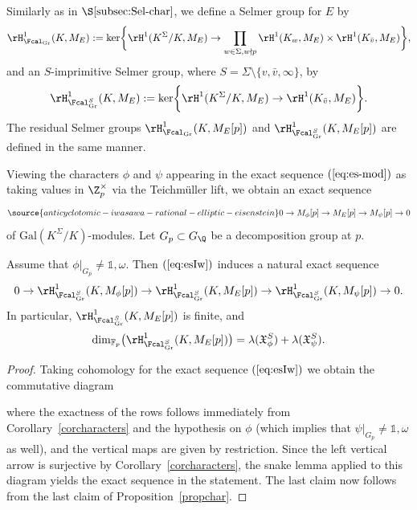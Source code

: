 Similarly as in $\S\ref{subsec:Sel-char}$, we define a Selmer group for $E$ by
\[
\rH^1_{\Fcal_{\rm Gr}}(K,M_E):=\ker\biggr\{\rH^1(K^\Sigma/K,M_E)\rightarrow\prod_{w \in \Sigma, w \nmid p}\rH^1(K_w,M_E)\times\rH^1(K_{\bar{v}},M_E)\biggr\},
\]
and an
{$S$-imprimitive Selmer group}, where $S=\Sigma\setminus\{v,\bar{v},\infty\}$, by
\[
\rH^1_{\Fcal_{\rm Gr}^S}(K,M_E):=\ker\biggr\{\rH^1(K^\Sigma/K,M_E)\rightarrow\rH^1(K_{\bar{v}},M_E)\biggr\}.
\]
The residual Selmer groups $\rH^1_{\Fcal_{\rm Gr}}(K,M_E[p])$ and $\rH^1_{\Fcal_{\rm Gr}^S}(K,M_E[p])$ are defined in the same manner.

Viewing the characters $\phi$ and $\psi$ appearing in the exact sequence $(\ref{eq:es-mod})$ as taking values in $\Z_p^\times$ via the Teichm\"uller lift, we obtain an exact sequence
\begin{equation}\label{eq:esIw}
\source{anticyclotomic-iwasawa-rational-elliptic-eisenstein}
0 \rightarrow M_\phi[p] \rightarrow M_E[p] \rightarrow M_\psi[p] \rightarrow 0
\end{equation}
of $\mathrm{Gal}(K^{\Sigma}/K)$-modules. Let $G_p\subset G_\Q$ be a decomposition group at $p$.

\begin{prop}
\notready\label{cormodp}
Assume that $\phi\vert_{G_{p}}\neq\mathds{1},\omega$. Then
$(\ref{eq:esIw})$ induces a natural exact sequence
\[
0 \rightarrow \rH^1_{\Fcal_{\rm Gr}^S}(K,M_\phi[p]) \rightarrow \rH^1_{\Fcal_{\rm Gr}^S}(K,M_E[p]) \rightarrow
\rH^1_{\Fcal_{\rm Gr}^S}(K,M_\psi[p]) \rightarrow 0.
\]
In particular, $\rH^1_{\Fcal_{\rm Gr}^S}(K,M_E[p])$ is finite, and
\[
\mathrm{dim}_{\mathbb{F}_p}\bigl(\rH^1_{\Fcal_{\rm Gr}^S}(K,M_E[p])\bigr)=\lambda(\mathfrak{X}_\phi^S)+\lambda(\mathfrak{X}_{\psi}^S).
\]
\end{prop}

\begin{proof}
Taking cohomology for the exact sequence $(\ref{eq:esIw})$ we obtain the commutative diagram


where the exactness of the rows follows immediately from Corollary~\ref{corcharacters} and the hypothesis on $\phi$
(which implies that $\psi|_{G_p}\neq\mathds{1},\omega$ as well),
and the vertical maps are given by restriction. Since the left vertical arrow is surjective by Corollary~\ref{corcharacters}, the snake lemma applied to this diagram yields the exact sequence in the statement. The last claim now follows from the last claim of Proposition~\ref{propchar}.
\end{proof}

